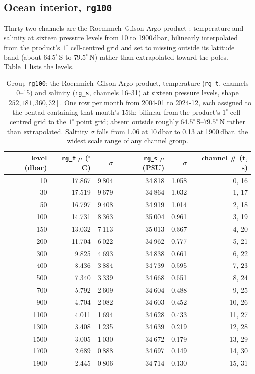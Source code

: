 \documentclass[10pt]{article}
\newcommand{\code}[1]{\texttt{#1}}
\begin{document}
\subsection{Ocean interior, \code{rg100}}

Thirty-two channels are the Roemmich--Gilson Argo product \cite{rg}:
temperature and salinity at sixteen pressure levels from 10 to 1900\,dbar,
bilinearly interpolated from the product's $1^\circ$ cell-centred grid and
set to missing outside its latitude band (about $64.5^\circ$\,S to
$79.5^\circ$\,N) rather than extrapolated toward the poles. Table~\ref{tab:rg100}
lists the levels.


\begin{table}[h]
\centering\setlength{\tabcolsep}{5pt}\footnotesize
\begin{tabular}{@{}rrrrrr@{}}
\toprule
level (dbar) & \code{rg\_t} $\mu$ ($^\circ$C) & $\sigma$ & \code{rg\_s} $\mu$ (PSU) & $\sigma$ & channel \# (t, s) \\
\midrule
10 & 17.867 & 9.804 & 34.818 & 1.058 & 0, 16 \\
30 & 17.519 & 9.679 & 34.864 & 1.032 & 1, 17 \\
50 & 16.797 & 9.408 & 34.919 & 1.014 & 2, 18 \\
100 & 14.731 & 8.363 & 35.004 & 0.961 & 3, 19 \\
150 & 13.032 & 7.113 & 35.013 & 0.867 & 4, 20 \\
200 & 11.704 & 6.022 & 34.962 & 0.777 & 5, 21 \\
300 & 9.825 & 4.693 & 34.838 & 0.661 & 6, 22 \\
400 & 8.436 & 3.884 & 34.739 & 0.595 & 7, 23 \\
500 & 7.340 & 3.339 & 34.668 & 0.551 & 8, 24 \\
700 & 5.792 & 2.609 & 34.604 & 0.488 & 9, 25 \\
900 & 4.704 & 2.082 & 34.603 & 0.452 & 10, 26 \\
1100 & 4.011 & 1.694 & 34.628 & 0.433 & 11, 27 \\
1300 & 3.408 & 1.235 & 34.639 & 0.219 & 12, 28 \\
1500 & 3.005 & 1.030 & 34.672 & 0.179 & 13, 29 \\
1700 & 2.689 & 0.888 & 34.697 & 0.149 & 14, 30 \\
1900 & 2.445 & 0.806 & 34.714 & 0.130 & 15, 31 \\
\bottomrule
\end{tabular}
\caption{Group \code{rg100}: the Roemmich--Gilson Argo product, temperature (\code{rg\_t}, channels 0--15) and salinity (\code{rg\_s}, channels 16--31) at sixteen pressure levels, shape $[252,181,360,32]$. One row per month from 2004-01 to 2024-12, each assigned to the pentad containing that month's 15th; bilinear from the product's $1^\circ$ cell-centred grid to the $1^\circ$ point grid; absent outside roughly $64.5^\circ$\,S--$79.5^\circ$\,N rather than extrapolated. Salinity $\sigma$ falls from 1.06 at 10\,dbar to 0.13 at 1900\,dbar, the widest scale range of any channel group.}
\label{tab:rg100}
\end{table}
\end{document}
